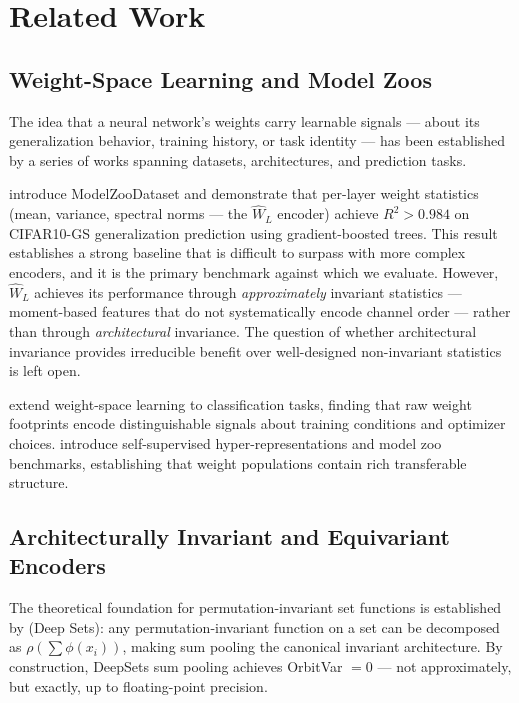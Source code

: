 \section{Related Work}
\label{sec:related}

\subsection{Weight-Space Learning and Model Zoos}

The idea that a neural network's weights carry learnable signals --- about its generalization behavior, training history, or task identity --- has been established by a series of works spanning datasets, architectures, and prediction tasks.

\citet{Unterthiner2020Predicting} introduce ModelZooDataset and demonstrate that per-layer weight statistics (mean, variance, spectral norms --- the $\hat{W}_L$ encoder) achieve $R^2 > 0.984$ on CIFAR10-GS generalization prediction using gradient-boosted trees. This result establishes a strong baseline that is difficult to surpass with more complex encoders, and it is the primary benchmark against which we evaluate. However, $\hat{W}_L$ achieves its performance through \emph{approximately} invariant statistics --- moment-based features that do not systematically encode channel order --- rather than through \emph{architectural} invariance. The question of whether architectural invariance provides irreducible benefit over well-designed non-invariant statistics is left open.

\citet{Eilertsen2020Classifying} extend weight-space learning to classification tasks, finding that raw weight footprints encode distinguishable signals about training conditions and optimizer choices. \citet{Schurholt2021Hyper,Schurholt2022Model} introduce self-supervised hyper-representations and model zoo benchmarks, establishing that weight populations contain rich transferable structure.

\subsection{Architecturally Invariant and Equivariant Encoders}

The theoretical foundation for permutation-invariant set functions is established by \citet{Zaheer2017Deep} (Deep Sets): any permutation-invariant function on a set can be decomposed as $\rho(\sum \phi(x_i))$, making sum pooling the canonical invariant architecture. By construction, DeepSets sum pooling achieves OrbitVar $= 0$ --- not approximately, but exactly, up to floating-point precision.

